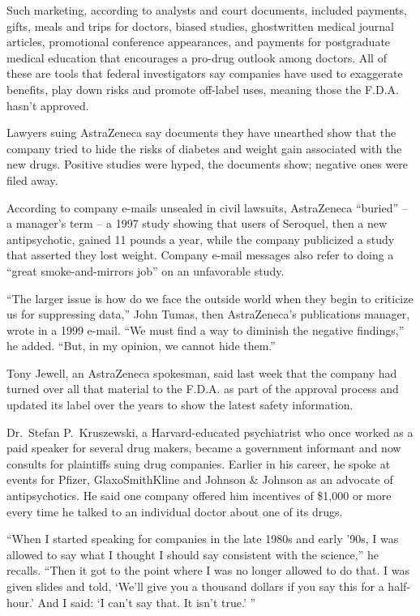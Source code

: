 ﻿\documentclass[12pt]{article}
\begin{document}
Such marketing, according to analysts and court documents, included payments, gifts, meals and trips
for doctors, biased studies, ghostwritten medical journal articles, promotional conference
appearances, and payments for postgraduate medical education that encourages a pro-drug outlook
among doctors. All of these are tools that federal investigators say companies have used to
exaggerate benefits, play down risks and promote off-label uses, meaning those the F.D.A. hasn't
approved.

Lawyers suing AstraZeneca say documents they have unearthed show that the company tried to hide the
risks of diabetes and weight gain associated with the new drugs. Positive studies were hyped, the
documents show; negative ones were filed away.

According to company e-mails unsealed in civil lawsuits, AstraZeneca ``buried'' -- a manager's term
-- a 1997 study showing that users of Seroquel, then a new antipsychotic, gained 11 pounds a year,
while the company publicized a study that asserted they lost weight. Company e-mail messages also
refer to doing a ``great smoke-and-mirrors job'' on an unfavorable study.

``The larger issue is how do we face the outside world when they begin to criticize us for
suppressing data,'' John Tumas, then AstraZeneca's publications manager, wrote in a 1999 e-mail.
``We must find a way to diminish the negative findings,'' he added. ``But, in my opinion, we cannot
hide them.''

Tony Jewell, an AstraZeneca spokesman, said last week that the company had turned over all that
material to the F.D.A. as part of the approval process and updated its label over the years to show
the latest safety information.

Dr.~Stefan P.~Kruszewski, a Harvard-educated psychiatrist who once worked as a paid speaker for
several drug makers, became a government informant and now consults for plaintiffs suing drug
companies. Earlier in his career, he spoke at events for Pfizer, GlaxoSmithKline and Johnson \&
Johnson as an advocate of antipsychotics. He said one company offered him incentives of \$1,000 or
more every time he talked to an individual doctor about one of its drugs.

``When I started speaking for companies in the late 1980s and early '90s, I was allowed to say what
I thought I should say consistent with the science,'' he recalls. ``Then it got to the point where I
was no longer allowed to do that. I was given slides and told, `We'll give you a thousand dollars if
you say this for a half-hour.' And I said: `I can't say that. It isn't true.' ''
\end{document}
